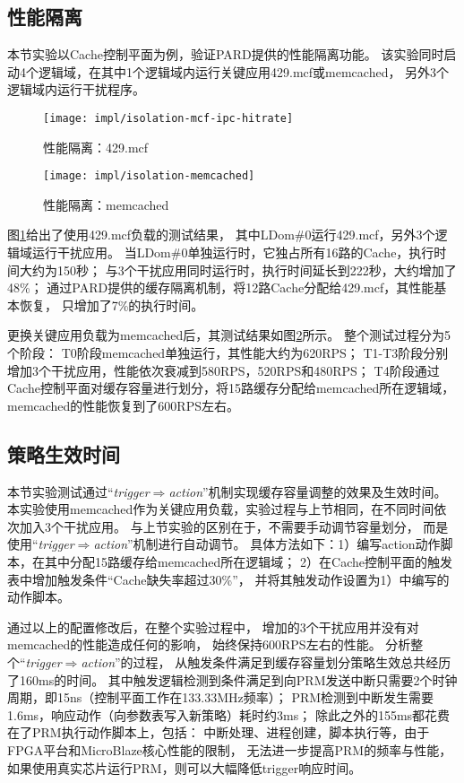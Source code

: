 \subsection{性能隔离}

本节实验以Cache控制平面为例，验证PARD提供的性能隔离功能。
该实验同时启动4个逻辑域，在其中1个逻辑域内运行关键应用429.mcf或memcached，
另外3个逻辑域内运行干扰程序。

\begin{figure}[tb]
  \centering
  \texttt{[image: impl/isolation-mcf-ipc-hitrate]}
  \caption{性能隔离：429.mcf}
  \label{fig:isolation-mcf-ipc-hitrate}
\end{figure}

\begin{figure}[tb]
  \centering
  \texttt{[image: impl/isolation-memcached]}
  \caption{性能隔离：memcached}
  \label{fig:isolation-memcached}
\end{figure}

图\ref{fig:isolation-mcf-ipc-hitrate}给出了使用429.mcf负载的测试结果，
其中LDom\#0运行429.mcf，另外3个逻辑域运行干扰应用。
当LDom\#0单独运行时，它独占所有16路的Cache，执行时间大约为150秒；
与3个干扰应用同时运行时，执行时间延长到222秒，大约增加了48\%；
通过PARD提供的缓存隔离机制，将12路Cache分配给429.mcf，其性能基本恢复，
只增加了7\%的执行时间。

更换关键应用负载为memcached后，其测试结果如图\ref{fig:isolation-memcached}所示。
整个测试过程分为5个阶段：
T0阶段memcached单独运行，其性能大约为620RPS；
T1-T3阶段分别增加3个干扰应用，性能依次衰减到580RPS，520RPS和480RPS；
T4阶段通过Cache控制平面对缓存容量进行划分，将15路缓存分配给memcached所在逻辑域，
memcached的性能恢复到了600RPS左右。


\subsection{策略生效时间}
\label{chap:impl:trigger-latency}

本节实验测试通过``\emph{trigger$\Rightarrow$action}''机制实现缓存容量调整的效果及生效时间。
本实验使用memcached作为关键应用负载，实验过程与上节相同，在不同时间依次加入3个干扰应用。
与上节实验的区别在于，不需要手动调节容量划分，
而是使用``\emph{trigger$\Rightarrow$action}''机制进行自动调节。
具体方法如下：1）编写action动作脚本，在其中分配15路缓存给memcached所在逻辑域；
2）在Cache控制平面的触发表中增加触发条件``Cache缺失率超过30\%''，
并将其触发动作设置为1）中编写的动作脚本。

通过以上的配置修改后，在整个实验过程中，
增加的3个干扰应用并没有对memcached的性能造成任何的影响，
始终保持600RPS左右的性能。
分析整个``\emph{trigger$\Rightarrow$action}''的过程，
从触发条件满足到缓存容量划分策略生效总共经历了160ms的时间。
其中触发逻辑检测到条件满足到向PRM发送中断只需要2个时钟周期，即15ns（控制平面工作在133.33MHz频率）；
PRM检测到中断发生需要1.6ms，响应动作（向参数表写入新策略）耗时约3ms；
除此之外的155ms都花费在了PRM执行动作脚本上，包括：
中断处理、进程创建，脚本执行等，由于FPGA平台和MicroBlaze核心性能的限制，
无法进一步提高PRM的频率与性能，如果使用真实芯片运行PRM，则可以大幅降低trigger响应时间。

